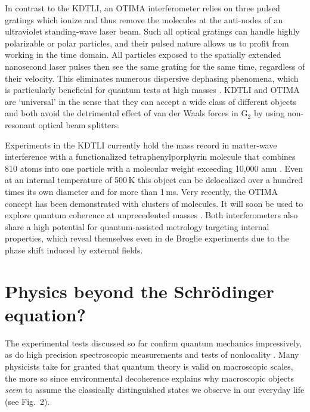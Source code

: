 \documentclass[12pt]{article}
\begin{document}
In contrast to the KDTLI, an OTIMA interferometer relies on three  pulsed  gratings which 
ionize and thus remove the molecules  at the anti-nodes of an ultraviolet standing-wave laser beam\cite{reiger2006exploration}. Such all optical gratings can handle highly polarizable or polar particles, and their pulsed nature 
allows us to profit from working in the time domain. All particles exposed to the spatially extended nanosecond 
laser pulses then see the same grating for the same time, regardless of their velocity. This eliminates numerous dispersive dephasing phenomena,
which is particularly beneficial for quantum tests at high masses \cite{Nimmrichter2011a_PRA_long,Nimmrichter2011b}.
KDTLI and OTIMA are `universal' 
in the sense that they can accept a wide class of different objects and
both avoid 
the detrimental effect of
van der Waals forces in G$_2$ by using non-resonant optical beam splitters.

Experiments in the KDTLI currently hold the mass record in matter-wave interference
with a functionalized tetraphenylporphyrin molecule that combines 810 atoms into one
particle with a molecular weight exceeding 10,000 amu \cite{Eibenberger2013}.
Even at an internal temperature of 500\,K this object can be 
delocalized over 
a hundred times its own diameter and for more than 1\,ms.
Very recently, the OTIMA concept has been demonstrated\cite{Haslinger2013} with clusters of molecules.
It will soon be used to explore quantum coherence at unprecedented masses \cite{Nimmrichter2011a_PRA_long}.
Both interferometers also share a high potential for quantum-assisted metrology targeting 
internal properties, which reveal themselves even in de Broglie experiments 
due to the phase shift induced by
external fields\cite{Berninger2007,Gerlich2008b,Tuexen2010}.

\section{Physics beyond the Schr\"odinger equation?}

The experimental tests discussed so far confirm quantum mechanics impressively, as do high precision spectroscopic measurements \cite{PhysRevLett.84.5496,PhysRevLett.97.030801} and tests of nonlocality \cite{freedman1972,aspect1982,giustina2013}. 
Many physicists take for granted that quantum theory is valid on macroscopic scales, the more so since environmental decoherence explains why macroscopic objects \emph{seem} to assume the classically distinguished states we observe in our everyday life\cite{Joos2003,Zurek2003} (see Fig.~2). 
\end{document}
